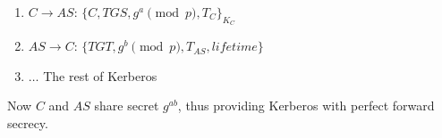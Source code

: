 \documentclass[11pt]{article}
\begin{document}
\begin{enumerate}
    \begin{enumerate}
      \item $C \to AS$: $\{ C, TGS, g^{a} \pmod{p}, T_{C} \}_{K_{C} }$
      \item $AS \to C$: $\{ TGT, g^{b} \pmod{p}, T_{AS}, lifetime \}$
      \item $\dots$ The rest of Kerberos
    \end{enumerate}

    Now $C$ and $AS$ share secret $g^{ab}$, thus providing Kerberos with perfect forward secrecy.

\end{enumerate}
\end{document}
